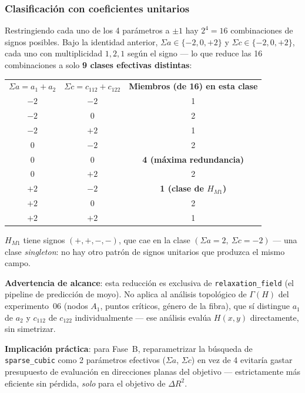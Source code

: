 \documentclass[11pt, a4paper]{article}
\newcommand{\TH}[1]{\cellcolor{cTHbg}\color{white}\textbf{#1}}
\newcommand{\good}[1]{\color{cGood}\textbf{#1}}
\newcommand{\bad}[1]{\color{cBad}\textbf{#1}}
\begin{document}
\subsubsection{Clasificaci\'on con coeficientes unitarios}

Restringiendo cada uno de los 4 par\'ametros a $\pm1$ hay
$2^4=16$ combinaciones de signos posibles. Bajo la identidad anterior,
$\Sigma a\in\{-2,0,+2\}$ y $\Sigma c\in\{-2,0,+2\}$, cada uno con
multiplicidad $1,2,1$ seg\'un el signo --- lo que reduce las 16
combinaciones a solo \textbf{9 clases efectivas distintas}:

\medskip
\begin{center}
\begin{tabular}{ccc}
  \TH{$\Sigma a=a_1+a_2$} & \TH{$\Sigma c=c_{112}+c_{122}$} & \TH{Miembros (de 16) en esta clase} \\[1pt]
  $-2$ & $-2$ & 1 \\
  $-2$ & $0$  & 2 \\
  $-2$ & $+2$ & 1 \\
  $0$  & $-2$ & 2 \\
  $0$  & $0$  & \bad{4 (m\'axima redundancia)} \\
  $0$  & $+2$ & 2 \\
  $+2$ & $-2$ & \good{1 (clase de $H_{M1}$)} \\
  $+2$ & $0$  & 2 \\
  $+2$ & $+2$ & 1 \\
\end{tabular}
\end{center}
\medskip

$H_{M1}$ tiene signos $(+,+,-,-)$, que cae en la clase
$(\Sigma a{=}2,\ \Sigma c{=}{-}2)$ --- una clase \emph{singleton}: no
hay otro patr\'on de signos unitarios que produzca el mismo campo.

\begin{tcolorbox}[pendingbox]
  \textbf{Advertencia de alcance}: esta reducci\'on es exclusiva de
  \texttt{relaxation\_field} (el pipeline de predicci\'on de moyo). No
  aplica al an\'alisis topol\'ogico de $\Gamma(H)$ del experimento~06
  (nodos $A_1$, puntos cr\'iticos, g\'enero de la fibra), que s\'i
  distingue $a_1$ de $a_2$ y $c_{112}$ de $c_{122}$ individualmente ---
  ese an\'alisis eval\'ua $H(x,y)$ directamente, sin simetrizar.
\end{tcolorbox}

\textbf{Implicaci\'on pr\'actica}: para Fase~B, reparametrizar la
b\'usqueda de \texttt{sparse\_cubic} como 2 par\'ametros efectivos
($\Sigma a$, $\Sigma c$) en vez de 4 evitar\'ia gastar presupuesto de
evaluaci\'on en direcciones planas del objetivo --- estrictamente m\'as
eficiente sin p\'erdida, \emph{solo} para el objetivo de $\Delta R^2$.
\end{document}
